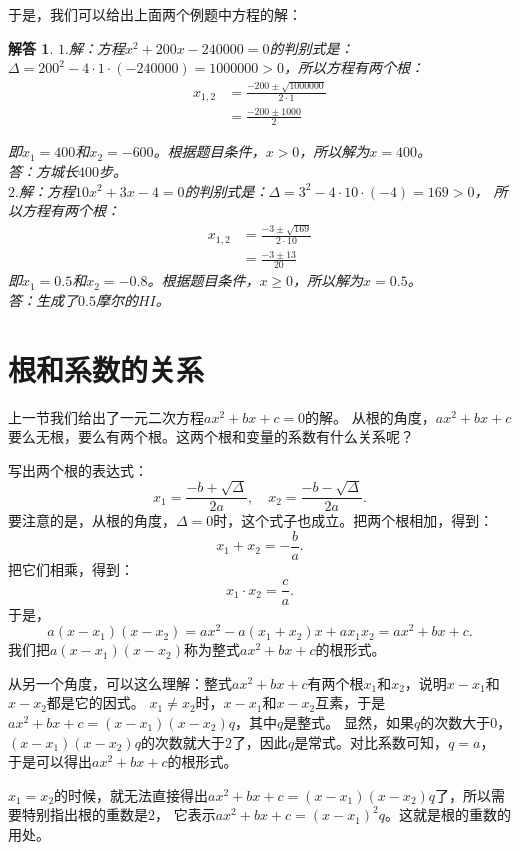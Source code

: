 \documentclass[12pt,UTF8]{ctexbook}
\newtheorem*{so}{解答}
\begin{document}
于是，我们可以给出上面两个例题中方程的解：
\begin{so}
    $1.$解：方程$ x^2 + 200x - 240000 = 0$的判别式是：
    $\Delta = 200^2 - 4\cdot 1\cdot (-240000) = 1000000 > 0$，所以方程有两个根：
    \begin{align*}
        x_{1,2} &= \frac{-200 \pm \sqrt{1000000}}{2\cdot 1}  \\
        &= \frac{-200 \pm 1000}{2} 
    \end{align*}

    即$x_1 = 400$和$x_2 = -600$。根据题目条件，$x>0$，所以解为$x = 400$。\\
    答：方城长$400$步。\\
    $2.$解：方程$10x^2 + 3x - 4 = 0$的判别式是：$\Delta = 3^2 - 4\cdot 10\cdot (-4) = 169 > 0$，
    所以方程有两个根：
    \begin{align*}
        x_{1,2} &= \frac{-3 \pm \sqrt{169}}{2\cdot 10}  \\
        &= \frac{-3 \pm 13}{20} 
    \end{align*}
    即$x_1 = 0.5$和$x_2 = -0.8$。根据题目条件，$x\geqslant 0$，所以解为$x = 0.5$。\\
    答：生成了$0.5$摩尔的$HI$。
\end{so}

\section{根和系数的关系}

上一节我们给出了一元二次方程$ax^2 + bx + c = 0$的解。
从根的角度，$ax^2 + bx + c $要么无根，要么有两个根。这两个根和变量的系数有什么关系呢？

写出两个根的表达式：
$$x_{1} = \frac{-b + \sqrt{\Delta}}{2a},\quad x_{2} = \frac{-b - \sqrt{\Delta}}{2a}.$$
要注意的是，从根的角度，$\Delta = 0$时，这个式子也成立。把两个根相加，得到：
$$ x_1 + x_2 = -\frac{b}{a}.$$
把它们相乘，得到：
$$ x_1 \cdot x_2 = \frac{c}{a}.$$
于是，
$$a(x - x_1)(x - x_2) = ax^2 - a(x_1 + x_2)x + ax_1x_2 = ax^2 + bx+c.$$
我们把$a(x - x_1)(x - x_2)$称为整式$ax^2 + bx+c$的根形式。

从另一个角度，可以这么理解：整式$ax^2 + bx + c$有两个根$x_1$和$x_2$，说明$x - x_1$和$x - x_2$都是它的因式。
$x_1 \neq x_2$时，$x - x_1$和$x - x_2$互素，于是$ax^2 + bx + c = (x - x_1)(x-x_2)q$，其中$q$是整式。
显然，如果$q$的次数大于$0$，$(x - x_1)(x-x_2)q$的次数就大于$2$了，因此$q$是常式。对比系数可知，$q = a$，
于是可以得出$ax^2 + bx+c$的根形式。

$x_1 = x_2$的时候，就无法直接得出$ax^2 + bx + c = (x - x_1)(x-x_2)q$了，所以需要特别指出根的重数是$2$，
它表示$ax^2 + bx + c = (x - x_1)^2 q$。这就是根的重数的用处。
\end{document}
